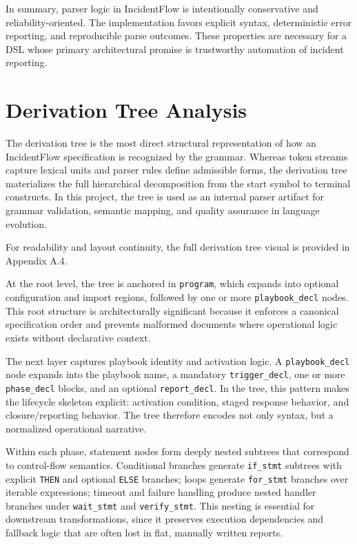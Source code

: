 In summary, parser logic in IncidentFlow is intentionally conservative and reliability-oriented. The implementation favors explicit syntax, deterministic error reporting, and reproducible parse outcomes. These properties are necessary for a DSL whose primary architectural promise is trustworthy automation of incident reporting.

\section{Derivation Tree Analysis}

The derivation tree is the most direct structural representation of how an IncidentFlow specification is recognized by the grammar. Whereas token streams capture lexical units and parser rules define admissible forms, the derivation tree materializes the full hierarchical decomposition from the start symbol to terminal constructs. In this project, the tree is used as an internal parser artifact for grammar validation, semantic mapping, and quality assurance in language evolution.

For readability and layout continuity, the full derivation tree visual is provided in Appendix A.4.

At the root level, the tree is anchored in \texttt{program}, which expands into optional configuration and import regions, followed by one or more \texttt{playbook\_decl} nodes. This root structure is architecturally significant because it enforces a canonical specification order and prevents malformed documents where operational logic exists without declarative context.

The next layer captures playbook identity and activation logic. A \texttt{playbook\_decl} node expands into the playbook name, a mandatory \texttt{trigger\_decl}, one or more \texttt{phase\_decl} blocks, and an optional \texttt{report\_decl}. In the tree, this pattern makes the lifecycle skeleton explicit: activation condition, staged response behavior, and closure/reporting behavior. The tree therefore encodes not only syntax, but a normalized operational narrative.

Within each phase, statement nodes form deeply nested subtrees that correspond to control-flow semantics. Conditional branches generate \texttt{if\_stmt} subtrees with explicit \texttt{THEN} and optional \texttt{ELSE} branches; loops generate \texttt{for\_stmt} branches over iterable expressions; timeout and failure handling produce nested handler branches under \texttt{wait\_stmt} and \texttt{verify\_stmt}. This nesting is essential for downstream transformations, since it preserves execution dependencies and fallback logic that are often lost in flat, manually written reports.

